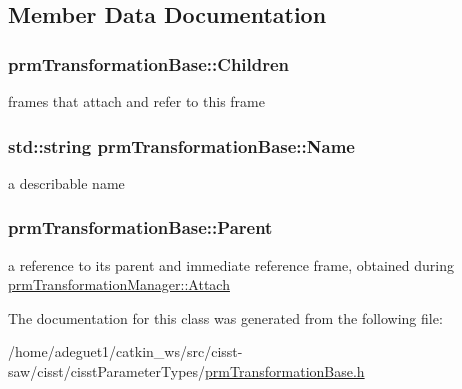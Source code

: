 \subsection{Member Data Documentation}
\hypertarget{classprm_transformation_base_affad35a2bd40ca707368739d300a7f76}{
\subsubsection[{Children}]{ prm\-Transformation\-Base\-::\-Children\hspace{0.3cm}{\ttfamily [protected]}}}\label{classprm_transformation_base_affad35a2bd40ca707368739d300a7f76}
frames that attach and refer to this frame \hypertarget{classprm_transformation_base_a4f96f394eb3f9d40077d8bc5825de87d}{
\subsubsection[{Name}]{\setlength{\rightskip}{0pt plus 5cm}std\-::string prm\-Transformation\-Base\-::\-Name\hspace{0.3cm}{\ttfamily [protected]}}}\label{classprm_transformation_base_a4f96f394eb3f9d40077d8bc5825de87d}
a describable name \hypertarget{classprm_transformation_base_a628228ce0f8caa0e5d7a46a61d3b548d}{
\subsubsection[{Parent}]{ prm\-Transformation\-Base\-::\-Parent\hspace{0.3cm}{\ttfamily [protected]}}}\label{classprm_transformation_base_a628228ce0f8caa0e5d7a46a61d3b548d}
a reference to its parent and immediate reference frame, obtained during \hyperlink{classprm_transformation_manager_a5fbac7977cdd5b1ba5aa714bdd43ebce}{prm\-Transformation\-Manager\-::\-Attach} 

The documentation for this class was generated from the following file\-:\begin{DoxyCompactItemize}
\item 
/home/adeguet1/catkin\-\_\-ws/src/cisst-\/saw/cisst/cisst\-Parameter\-Types/\hyperlink{prm_transformation_base_8h}{prm\-Transformation\-Base.\-h}\end{DoxyCompactItemize}

